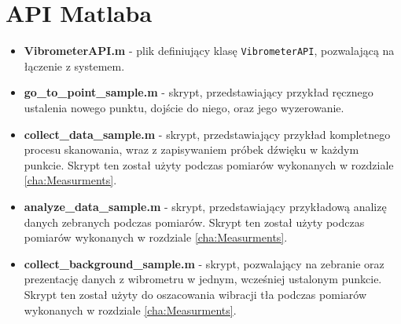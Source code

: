 \section{API Matlaba}
\label{appendix:maltalb_api}
\begin{itemize}
    \item \textbf{VibrometerAPI.m} - plik definiujący klasę \texttt{VibrometerAPI}, pozwalającą na łączenie z systemem.
    \item \textbf{go\_to\_point\_sample.m} - skrypt, przedstawiający przykład ręcznego ustalenia nowego punktu, dojście do niego, oraz jego wyzerowanie.
    \item \textbf{collect\_data\_sample.m} - skrypt, przedstawiający przykład kompletnego procesu skanowania, wraz z zapisywaniem próbek dźwięku w każdym punkcie. Skrypt ten został użyty podczas pomiarów wykonanych w rozdziale \ref{cha:Measurments}.
    \item \textbf{analyze\_data\_sample.m} - skrypt, przedstawiający przykładową analizę danych zebranych podczas pomiarów. Skrypt ten został użyty podczas pomiarów wykonanych w rozdziale \ref{cha:Measurments}.
    \item \textbf{collect\_background\_sample.m} - skrypt, pozwalający na zebranie oraz prezentację danych z wibrometru w jednym, wcześniej ustalonym punkcie. Skrypt ten został użyty do oszacowania wibracji tła podczas pomiarów wykonanych w rozdziale \ref{cha:Measurments}.
\end{itemize}
